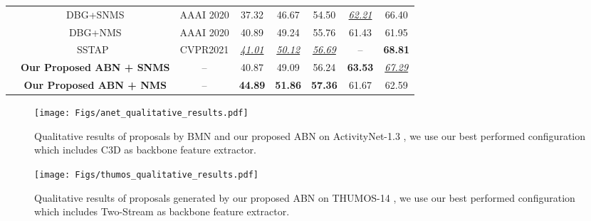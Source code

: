 \documentclass{ieeeaccess}
\begin{document}
\begin{table*}[t]
\begin{tabular}{c| c c c c c c c }
& DBG+SNMS \cite{dbg} &  AAAI 2020 &    37.32 & 46.67 & 54.50 & \underline{\textit{62.21}} & 66.40     \\ 
& DBG+NMS\cite{dbg}   & AAAI 2020     & 40.89 & 49.24 & 55.76 & 61.43 & 61.95 \\
& SSTAP~\cite{wang2021self} & CVPR2021 & \underline{\textit{41.01}} &  \underline{\textit{50.12}} & \underline{\textit{56.69}} & -- &  \textbf{68.81} \\
\cline{2-8} 
& \textbf{Our Proposed ABN + SNMS} & -- &   40.87 & 49.09 & 56.24 &   \textbf{63.53}   &    \underline{\textit{67.29}}   \\ 
& \textbf{Our Proposed ABN + NMS} & -- &   \textbf{44.89}&   
\textbf{51.86}&  \textbf{57.36}   & 61.67 & 62.59\\
\bottomrule
\end{tabular}
\label{thumos}
\end{table*}

\begin{figure*}[ht]
  \begin{center}
    \texttt{[image: Figs/anet\_qualitative\_results.pdf]}
    \caption{Qualitative results of proposals by BMN \cite{bmn} and our proposed ABN on ActivityNet-1.3 \cite{caba2015activitynet}, we use our best performed configuration which includes C3D \cite{C3D_3} as backbone feature extractor.}
  \label{qualitative_results_anet}
  \end{center}
\end{figure*}

\begin{figure*}[ht]
  \begin{center}
    \texttt{[image: Figs/thumos\_qualitative\_results.pdf]}
    \caption{Qualitative results of proposals generated by our proposed ABN on THUMOS-14 \cite{THUMOS14}, we use our best performed configuration which includes Two-Stream \cite{2_stream_1} as backbone feature extractor.}
  \label{qualitative_results_thumos}
  \end{center}
\end{figure*}
\end{document}
